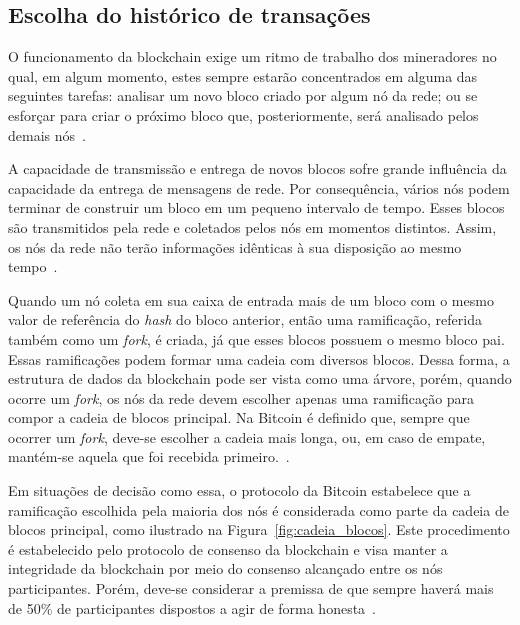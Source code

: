 \subsection{Escolha do histórico de transações}

O funcionamento da blockchain exige um ritmo de trabalho dos mineradores no qual, em algum momento, estes sempre estarão concentrados em alguma das seguintes tarefas: analisar um novo bloco criado por algum nó da rede; ou se esforçar para criar o próximo bloco que, posteriormente, será analisado pelos demais nós~\cite{overview-blockchainbasic2018drescher}.

A capacidade de transmissão e entrega de novos blocos sofre grande influência da capacidade da entrega de mensagens de rede. Por consequência, vários nós podem terminar de construir um bloco em um pequeno intervalo de tempo. Esses blocos são transmitidos pela rede e coletados pelos nós em momentos distintos. Assim, os nós da rede não terão informações idênticas à sua disposição ao mesmo tempo~\cite{overview-blockchainbasic2018drescher}. 

Quando um nó coleta em sua caixa de entrada mais de um bloco com o mesmo valor de referência do \textit{hash} do bloco anterior, então uma ramificação, referida também como um \textit{fork}, é criada, já que esses blocos possuem o mesmo bloco pai. Essas ramificações podem formar uma cadeia com diversos blocos. Dessa forma, a estrutura de dados da blockchain pode ser vista como uma árvore, porém, quando ocorre um \textit{fork}, os nós da rede devem escolher apenas uma ramificação para compor a cadeia de blocos principal. Na Bitcoin é definido que, sempre que ocorrer um \textit{fork}, deve-se escolher a cadeia mais longa, ou, em caso de empate, mantém-se aquela que foi recebida primeiro.~\cite{overview-blockchainbasic2018drescher, sompolinsky2015ghost-original}.


Em situações de decisão como essa, o protocolo da Bitcoin estabelece que a ramificação escolhida pela maioria dos nós é considerada como parte da cadeia de blocos principal, como ilustrado na Figura~\ref{fig:cadeia_blocos}. Este procedimento é estabelecido pelo protocolo de consenso da blockchain e visa manter a integridade da blockchain por meio do consenso alcançado entre os nós participantes. Porém, deve-se considerar a premissa de que sempre haverá mais de 50\% de participantes dispostos a agir de forma honesta~\cite{overview-bitcoin2008nakamoto}. 


